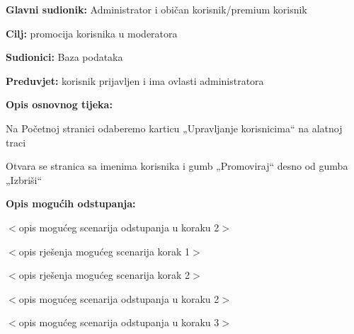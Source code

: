 	\noindent {}
\begin{packed_item}
	
	\item \textbf{Glavni sudionik: }Administrator i običan korisnik/premium korisnik
	\item  \textbf{Cilj:} promocija korisnika u moderatora
	\item  \textbf{Sudionici:}
	Baza podataka
	\item  \textbf{Preduvjet:} korisnik prijavljen i ima ovlasti administratora
	\item  \textbf{Opis osnovnog tijeka:}
	
	\item[] \begin{packed_enum}
		
		\item	Na Početnoj stranici odaberemo karticu „Upravljanje korisnicima“ na alatnoj traci
		\item	Otvara se stranica sa imenima korisnika i gumb „Promoviraj“ desno od gumba „Izbriši“ 
		
	\end{packed_enum}
	
	\item  \textbf{Opis mogućih odstupanja:}
	
	\item[] \begin{packed_item}
		
		\item[2.a] $<$opis mogućeg scenarija odstupanja u koraku 2$>$
		\item[] \begin{packed_enum}
			
			\item $<$opis rješenja mogućeg scenarija korak 1$>$
			\item $<$opis rješenja mogućeg scenarija korak 2$>$
			
		\end{packed_enum}
		\item[2.b] $<$opis mogućeg scenarija odstupanja u koraku 2$>$
		\item[3.a] $<$opis mogućeg scenarija odstupanja  u koraku 3$>$
		
	\end{packed_item}
\end{packed_item}

